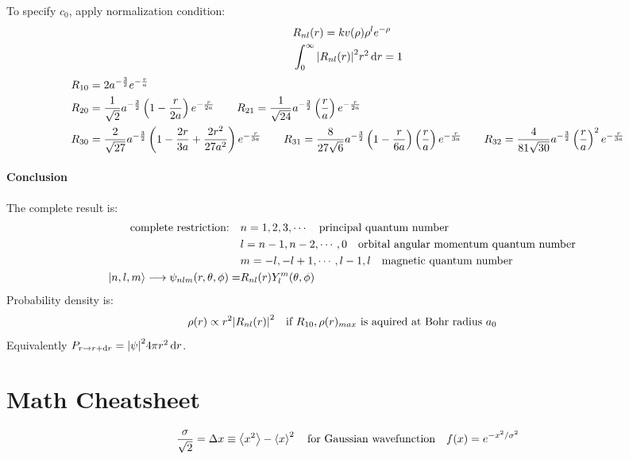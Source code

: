\documentclass[a4paper,10pt]{article}
\begin{document}
To specify $c_0$, apply normalization condition:
\begin{align*}
     & R_{nl}(r)=kv(\rho)\rho^le^{-\rho}           \\
     & \int_0^{\infty}\abs{R_{nl}(r)}^2r^2\dd{r}=1
\end{align*}
\begin{align*}
     & R_{10}=2a^{-\frac{3}{2}}e^{-\frac{r}{a}}                                                                                                                                                                                       \\
     & R_{20}=\frac{1}{\sqrt{2}}a^{-\frac{3}{2}}\left(1-\frac{r}{2a}\right)e^{-\frac{r}{2a}}\qq{}R_{21}=\frac{1}{\sqrt{24}}a^{-\frac{3}{2}}\left(\frac{r}{a}\right)e^{-\frac{r}{2a}}                                                  \\
     & R_{30}=\frac{2}{\sqrt{27}}a^{-\frac{3}{2}}\left(1-\frac{2r}{3a}+\frac{2r^2}{27a^2}\right)e^{-\frac{r}{3a}}\qq{}R_{31}=\frac{8}{27\sqrt{6}}a^{-\frac{3}{2}}\left(1-\frac{r}{6a}\right)\left(\frac{r}{a}\right)e^{-\frac{r}{3a}}
    \qq{}R_{32}=\frac{4}{81\sqrt{30}}a^{-\frac{3}{2}}\left(\frac{r}{a}\right)^2e^{-\frac{r}{3a}}                                                                                                                                      \\
\end{align*}
\paragraph{Conclusion}
The complete result is:
\begin{align*}
    \qq{complete restriction:}                           & n=1,2,3,\cdots\qq{principal quantum number}                    \\
                                                         & l=n-1,n-2,\cdots,0\qq{orbital angular momentum quantum number} \\
                                                         & m=-l,-l+1,\cdots,l-1,l\qq{magnetic quantum number}             \\
    \ket{n,l,m}\longrightarrow\psi_{nlm}(r,\theta,\phi)= & R_{nl}(r)Y_l^m(\theta,\phi)
\end{align*}
Probability density is:
$$\rho(r)\propto r^2\abs{R_{nl}(r)}^2\qq{if $R_{10},\rho(r)_{max}$ is aquired at Bohr radius $a_0$}$$
Equivalently $P_{r\to r+\dd{r}}=\abs{\psi}^24\pi r^2\dd{r}$.
\section{Math Cheatsheet}
$$\frac{\sigma}{\sqrt{2}}=\Delta x\equiv\expval{x^2}-\expval{x}^2\qq{for Gaussian wavefunction}f(x)=e^{-x^2/\sigma^2}$$
\end{document}
